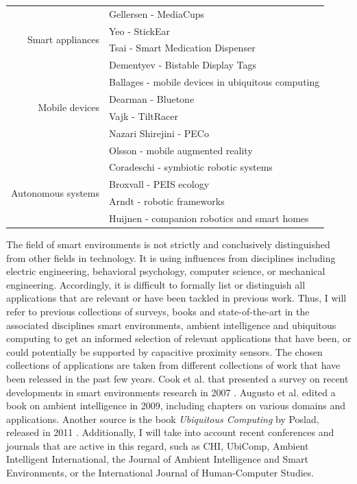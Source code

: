 \begin{table}[htbp]
\begin{tabular}{rl}
    \multirow{4}[0]{*}{Smart appliances} & Gellersen - MediaCups \cite{gellersen1999mediacup} \\
          & Yeo - StickEar \cite{yeo2013stickear} \\
          & Tsai - Smart Medication Dispenser \cite{tsai2011smart} \\
          & Dementyev - Bistable Display Tags \cite{dementyev2013wirelessly} \\[1em]
    \multirow{4}[0]{*}{Mobile devices} & Ballages - mobile devices in ubiquitous computing \cite{ballagas2006smart} \\
          & Dearman - Bluetone \cite{dearman2009bluetone} \\
          	& Vajk - TiltRacer \cite{vajk2007using} \\
          & Nazari Shirejini - PECo \cite{shirehjini2004novel} \\
          & Olsson - mobile augmented reality \cite{olsson2012user} \\[1em]
    \multirow{4}[0]{*}{Autonomous systems} & Coradeschi - symbiotic robotic systems \cite{coradeschi2006symbiotic} \\
          & Broxvall - PEIS ecology \cite{broxvall2006peis} \\
          & Arndt - robotic frameworks \cite{arndt2013performance} \\
          & Huijnen - companion robotics and smart homes \cite{huijnen2011maybe} \\
    \bottomrule
    \end{tabular}%
  \label{tab:rel_se_apps}%
\end{table}

The field of smart environments is not strictly and conclusively distinguished from other fields in technology. It is using influences from disciplines including electric engineering, behavioral psychology, computer science, or mechanical engineering. Accordingly, it is difficult to formally list or distinguish all applications that are relevant or have been tackled in previous work. Thus, I will refer to previous collections of surveys, books and state-of-the-art in the associated disciplines smart environments, ambient intelligence and ubiquitous computing to get an informed selection of relevant applications that have been, or could potentially be supported by capacitive proximity sensors. The chosen collections of applications are taken from different collections of work that have been released in the past few years. Cook et al. that presented a survey on recent developments in smart environments research in 2007 \cite{cook2007smart}. Augusto et al. edited a book on ambient intelligence in 2009, including chapters on various domains and applications. Another source is the book \emph{Ubiquitous Computing} by Poslad, released in 2011 \cite{poslad2011ubiquitous}. Additionally, I will take into account recent  conferences and journals that are active in this regard, such as CHI, UbiComp, Ambient Intelligent International, the Journal of Ambient Intelligence and Smart Environments, or the International Journal of Human-Computer Studies.

